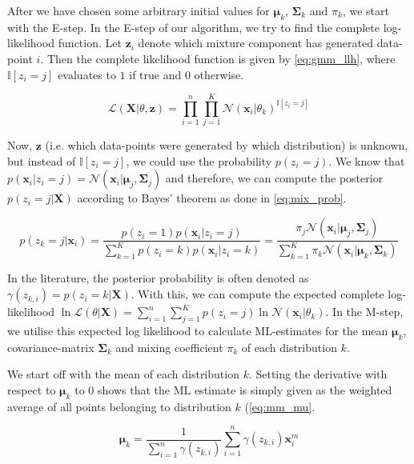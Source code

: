  After we have chosen some arbitrary initial values for $\bm{\mu}_k$, $\bm{\Sigma}_k$ and $\pi_k$, we start with the E-step. In the E-step of our algorithm, we try to find the complete log-likelihood function. Let $\bm{z}_i$ denote which mixture component has generated data-point $i$. Then the complete likelihood function is given by \ref{eq:gmm_llh}, where $\mathbb{I}[z_i=j]$ evaluates to $1$ if true and $0$ otherwise. 

\begin{equation}\label{eq:gmm_llh}
    \mathcal{L}(\bm{X}|\theta, \bm{z}) = \prod^n_{i=1} \prod^K_{j=1} \mathcal{N}(\bm{x}_i|\theta_k)^{\mathbb{I}[z_i=j]}
\end{equation}

Now, $\bm{z}$ (i.e. which data-points were generated by which distribution) is unknown, but instead of $\mathbb{I}[z_i=j]$, we could use the probability $p(z_i=j)$. We know that $p(\bm{x}_i|z_i=j) = \mathcal{N}(\bm{x}_i|\bm{\mu}_j, \bm{\Sigma}_j)$ and therefore, we can compute the posterior $p(z_i=j|\bm{X})$ according to Bayes' theorem as done in \ref{eq:mix_prob}.

\begin{equation}\label{eq:mix_prob}
    p(z_k=j|\textbf{x}_i)
    =\frac{p(z_i=1) p(\textbf{x}_i|z_i=j)}{\sum^K_{k=1}p(z_i=k)p(\textbf{x}_i|z_i=k)}
    = \frac{\pi_j\mathcal{N}(\textbf{x}_i|\bm{\mu}_j, \bm{\Sigma}_j)}{\sum_{k=1}^K\pi_k\mathcal{N}(\textbf{x}_i|\bm{\mu}_k, \bm{\Sigma}_k)} 
\end{equation}

In the literature, the posterior probability is often denoted as $\gamma(z_{k,i}) = p(z_i=k|\bm{X})$.
With this, we can compute the expected complete log-likelihood $\ln \mathcal{L}(\theta|\bm{X}) = \sum^n_{i=1} \sum^K_{j=1} p(z_i=j) \ln \mathcal{N}(\bm{x}_i|\theta_k)$. In the M-step, we utilise this expected log likelihood to calculate ML-estimates for the mean $\bm{\mu}_k$, covariance-matrix $\bm{\Sigma}_k$ and mixing coefficient $\pi_k$ of each distribution $k$.

We start off with the mean of each distribution $k$. Setting the derivative with respect to $\bm{\mu}_k$ to $0$ shows that the ML estimate is simply given as the weighted average of all points belonging to distribution $k$ (\ref{eq:mm_mu}.

\begin{equation}\label{eq:mm_mu}
    \bm{\mu}_k = \frac{1}{\sum^n_{i=1} \gamma(z_{k,i})} \sum^n_{i=1} \gamma(z_{k,i}) \textbf{x}^m_i
\end{equation}

